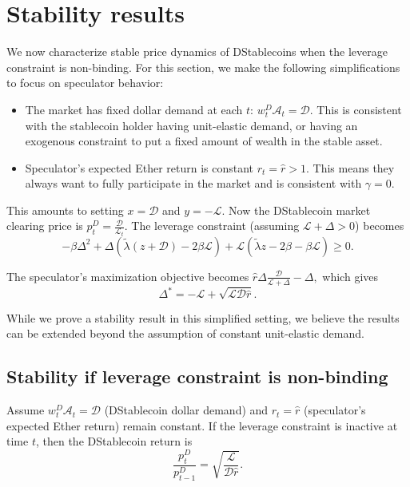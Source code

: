 \section{Stability results}\label{sec:stable_v_unstable}

We now characterize stable price dynamics of DStablecoins when the leverage constraint is non-binding. For this section, we make the following simplifications to focus on speculator behavior:
\begin{itemize}
	\item The market has fixed dollar demand at each $t$: $w^D_t \mathcal{A}_t = \mathcal{D}$. This is consistent with the stablecoin holder having unit-elastic demand, or having an exogenous constraint to put a fixed amount of wealth in the stable asset.
	\item Speculator's expected Ether return is constant $r_t = \hat r>1$. This means they always want to fully participate in the market and is consistent with $\gamma=0$.
\end{itemize}
This amounts to setting $x = \mathcal{D}$ and $y=-\mathcal{L}$. Now the DStablecoin market clearing price is
$p^D_t = \frac{\mathcal{D}}{\mathcal{L}_t}.$
The leverage constraint (assuming $\mathcal{L} + \Delta > 0$) becomes
$$-\beta\Delta^2 + \Delta(\tilde\lambda(z+\mathcal{D}) - 2\beta\mathcal{L}) + \mathcal{L}(\tilde\lambda z - 2\beta - \beta\mathcal{L}) \geq 0.$$

The speculator's maximization objective becomes
$\hat r\Delta \frac{\mathcal{D}}{\mathcal{L}+\Delta} - \Delta,$
which gives
$$\Delta^* = -\mathcal{L} + \sqrt{\mathcal{L}\mathcal{D}\hat r}.$$

While we prove a stability result in this simplified setting, we believe the results can be extended beyond the assumption of constant unit-elastic demand.



\subsection{Stability if leverage constraint is non-binding}
\begin{proposition}\label{prop:stable1}
	Assume $w_t^D \mathcal{A}_t = \mathcal{D}$ (DStablecoin dollar demand) and $r_t = \hat r$ (speculator's expected Ether return) remain constant. If the leverage constraint is inactive at time $t$, then the DStablecoin return is
	$$\frac{p^D_t}{p^D_{t-1}} = \sqrt{\frac{\mathcal{L}}{\mathcal{D}\hat r}}.$$
\end{proposition}

